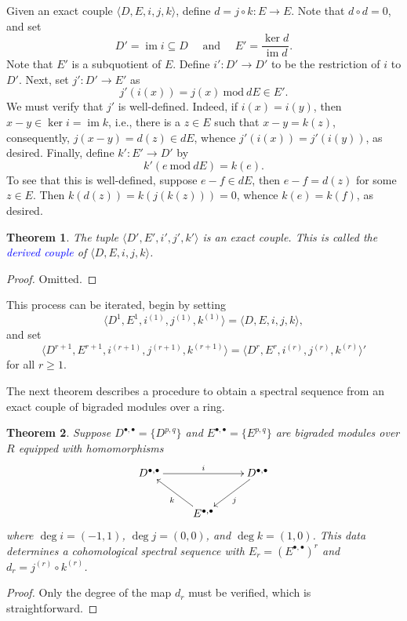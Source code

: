 \documentclass[11pt]{article}
\theoremstyle{thmstyle}
\newtheorem{theorem}{Theorem}
\theoremstyle{defstyle}
\newcommand{\im}{\operatorname{im}}
\newcommand{\define}[1]{\textcolor{blue}{\textit{#1}}}
\renewcommand{\mod}{~\mathrm{mod}~}
\renewcommand{\ge}{\geqslant}
\begin{document}
Given an exact couple $\langle D, E, i, j, k\rangle$, define $d = j\circ k\colon E\to E$. Note that $d\circ d = 0$, and set 
\begin{equation*}
    D' = \im i\subseteq D\quad\text{ and }\quad E' = \frac{\ker d}{\im d}.
\end{equation*}
Note that $E'$ is a subquotient of $E$. Define $i'\colon D'\to D'$ to be the restriction of $i$ to $D'$. Next, set $j'\colon D'\to E'$ as 
\begin{equation*}
    j'(i(x)) = j(x)\mod{dE}\in E'.
\end{equation*}
We must verify that $j'$ is well-defined. Indeed, if $i(x) = i(y)$, then $x - y\in\ker i = \im k$, i.e., there is a $z\in E$ such that $x - y = k(z)$, consequently, $j(x - y) = d(z)\in dE$, whence $j'(i(x)) = j'(i(y))$, as desired. Finally, define $k'\colon E'\to D'$ by 
\begin{equation*}
    k'(e \mod{dE}) = k(e). 
\end{equation*}
To see that this is well-defined, suppose $e - f\in dE$, then $e - f = d(z)$ for some $z\in E$. Then $k(d(z)) = k(j(k(z))) = 0$, whence $k(e) = k(f)$, as desired.

\begin{theorem}
    The tuple $\langle D', E', i', j', k'\rangle$ is an exact couple. This is called the \define{derived couple} of $\langle D, E, i, j, k\rangle$.
\end{theorem}
\begin{proof}
    Omitted.
\end{proof}

This process can be iterated, begin by setting 
\begin{equation*}
    \langle D^1, E^1, i^{(1)}, j^{(1)}, k^{(1)}\rangle = \langle D, E, i, j, k\rangle,
\end{equation*}
and set 
\begin{equation*}
    \langle D^{r + 1}, E^{r + 1}, i^{(r + 1)}, j^{(r + 1)}, k^{(r + 1)}\rangle = \langle D^{r}, E^r, i^{(r)}, j^{(r)}, k^{(r)}\rangle'
\end{equation*}
for all $r\ge 1$.

The next theorem describes a procedure to obtain a spectral sequence from an exact couple of bigraded modules over a ring.

\begin{theorem}
    Suppose $D^{\bullet,\bullet} = \{D^{p, q}\}$ and $E^{\bullet, \bullet} = \{E^{p, q}\}$ are bigraded modules over $R$ equipped with homomorphisms 
    \begin{equation*}
        \xymatrix {
            D^{\bullet, \bullet}\ar[rr]^i & & D^{\bullet,\bullet}\ar[ld]^j\\
            & E^{\bullet, \bullet}\ar[lu]^k & 
        }
    \end{equation*}
    where $\deg i = (-1, 1)$, $\deg j = (0, 0)$, and $\deg k = (1, 0)$. This data determines a cohomological spectral sequence with $E_r = (E^{\bullet,\bullet})^{r}$ and $d_r = j^{(r)}\circ k^{(r)}$.
\end{theorem}
\begin{proof}
    Only the degree of the map $d_r$ must be verified, which is straightforward. 
\end{proof}
\end{document}
